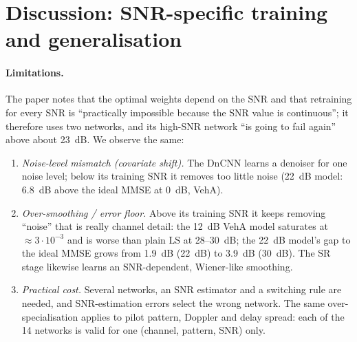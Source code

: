 \documentclass[10pt,a4paper]{article}
\begin{document}
\section{Discussion: SNR-specific training and generalisation}
\label{sec:discussion}

\paragraph{Limitations.} The paper notes that the optimal weights depend on the SNR and that retraining
for every SNR is ``practically impossible because the SNR value is continuous''; it therefore uses two
networks, and its high-SNR network ``is going to fail again'' above about 23~dB. We observe the same:
\begin{enumerate}
  \item \emph{Noise-level mismatch (covariate shift).} The DnCNN learns a denoiser for one noise level;
    below its training SNR it removes too little noise (22~dB model: 6.8~dB above the ideal MMSE at 0~dB, VehA).
  \item \emph{Over-smoothing / error floor.} Above its training SNR it keeps removing ``noise'' that is
    really channel detail: the 12~dB VehA model saturates at $\approx3\cdot10^{-3}$ and is worse than plain
    LS at 28--30~dB; the 22~dB model's gap to the ideal MMSE grows from 1.9~dB (22~dB) to 3.9~dB (30~dB).
    The SR stage likewise learns an SNR-dependent, Wiener-like smoothing.
  \item \emph{Practical cost.} Several networks, an SNR estimator and a switching rule are needed, and
    SNR-estimation errors select the wrong network. The same over-specialisation applies to pilot pattern,
    Doppler and delay spread: each of the 14 networks is valid for one (channel, pattern, SNR) only.
\end{enumerate}
\end{document}
